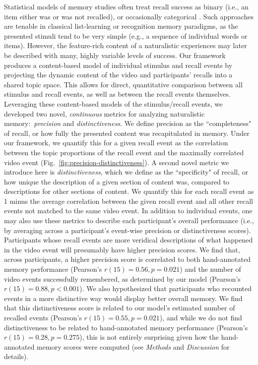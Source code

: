 \documentclass{article}
\begin{document}
Statistical models of memory studies often treat recall success as binary (i.e., an item either was or was not recalled), or occasionally categorical \citep[e.g., to distinguish familiarity from recollection;][]{YoneEtal02}.  Such approaches are tenable in classical list-learning or recognition memory paradigms, as the presented stimuli tend to be very simple (e.g., a sequence of individual words or items).  However, the feature-rich content of a naturalistic experiences may later be described with many, highly variable levels of success.  Our framework produces a content-based model of individual stimulus and recall events by projecting the dynamic content of the video and participants' recalls into a shared topic space.  This allows for direct, quantitative comparison between all stimulus and recall events, as well as between the recall events themselves.  Leveraging these content-based models of the stimulus/recall events, we developed two novel, \textit{continuous} metrics for analyzing naturalistic memory:~\textit{precision} and \textit{distinctiveness}.  We define precision as the ``completeness" of recall, or how fully the presented content was recapitulated in memory.  Under our framework, we quantify this for a given recall event as the correlation between the topic proportions of the recall event and the maximally correlated video event (Fig.~\ref{fig:precision-distinctiveness}).  A second novel metric we introduce here is \textit{distinctiveness}, which we define as the ``specificity" of recall, or how unique the description of a given section of content was, compared to descriptions for other sections of content.  We quantify this for each recall event as 1 minus the average correlation between the given recall event and all other recall events not matched to the same video event.  In addition to individual events, one may also use these metrics to describe each participant's overall performance (i.e., by averaging across a participant's event-wise precision or distinctiveness scores).  Participants whose recall events are more veridical descriptions of what happened in the video event will presumably have higher precision scores. We find that, across participants, a higher precision score is correlated to both hand-annotated memory performance (Pearson's $r(15) = 0.56, p = 0.021$) and the number of video events successfully remembered, as determined by our model (Pearson's $r(15) = 0.88, p < 0.001$).  We also hypothesized that participants who recounted events in a more distinctive way would display better overall memory.  We find that this distinctiveness score is related to our model's estimated number of recalled events (Pearson's $r(15) = 0.55, p = 0.021$), and while we do not find distinctiveness to be related to hand-annotated memory performance (Pearson's $r(15) = 0.28, p = 0.275$), this is not entirely surprising given how the hand-annotated memory scores were computed (see \textit{Methods} and \textit{Discussion} for details).
\end{document}

